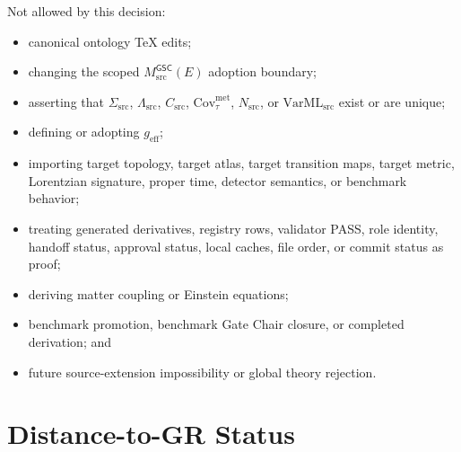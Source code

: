 \documentclass[11pt]{article}
\newcommand{\MsrcGSC}{M_{\mathrm{src}}^{\mathsf{GSC}}}
\newcommand{\geff}{g_{\mathrm{eff}}}
\begin{document}
Not allowed by this decision:
\begin{itemize}[leftmargin=*]
  \item canonical ontology TeX edits;
  \item changing the scoped \(\MsrcGSC(E)\) adoption boundary;
  \item asserting that \(\Sigma_{\mathrm{src}}\),
  \(\Lambda_{\mathrm{src}}\), \(C_{\mathrm{src}}\),
  \(\mathrm{Cov}_{\tau}^{\mathrm{met}}\), \(N_{\mathrm{src}}\), or
  \(\mathrm{VarML}_{\mathrm{src}}\) exist or are unique;
  \item defining or adopting \(\geff\);
  \item importing target topology, target atlas, target transition maps,
  target metric, Lorentzian signature, proper time, detector semantics, or
  benchmark behavior;
  \item treating generated derivatives, registry rows, validator PASS, role
  identity, handoff status, approval status, local caches, file order, or
  commit status as proof;
  \item deriving matter coupling or Einstein equations;
  \item benchmark promotion, benchmark Gate Chair closure, or completed
  derivation; and
  \item future source-extension impossibility or global theory rejection.
\end{itemize}

\section{Distance-to-GR Status}
\end{document}
